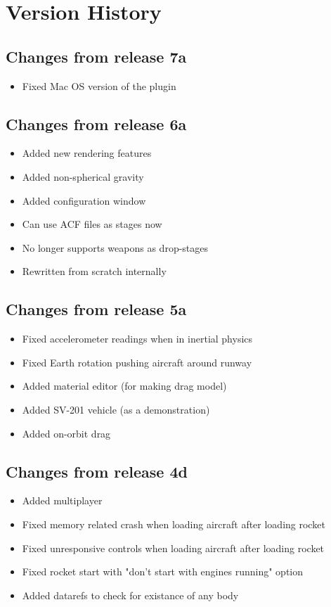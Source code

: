 \documentclass{article}
\begin{document}
\section{Version History}
\subsection{Changes from release 7a}
\begin{itemize}
  \item Fixed Mac OS version of the plugin
\end{itemize}

\subsection{Changes from release 6a}
\begin{itemize}
  \item Added new rendering features
  \item Added non-spherical gravity
  \item Added configuration window
  \item Can use ACF files as stages now
  \item No longer supports weapons as drop-stages
  \item Rewritten from scratch internally
\end{itemize}

\subsection{Changes from release 5a}
\begin{itemize}
  \item Fixed accelerometer readings when in inertial physics
  \item Fixed Earth rotation pushing aircraft around runway
  \item Added material editor (for making drag model)
  \item Added SV-201 vehicle (as a demonstration)
  \item Added on-orbit drag
\end{itemize}

\subsection{Changes from release 4d}
\begin{itemize}
  \item Added multiplayer
  \item Fixed memory related crash when loading aircraft after loading rocket
  \item Fixed unresponsive controls when loading aircraft after loading rocket
  \item Fixed rocket start with "don't start with engines running" option
  \item Added datarefs to check for existance of any body
\end{itemize}
\end{document}
